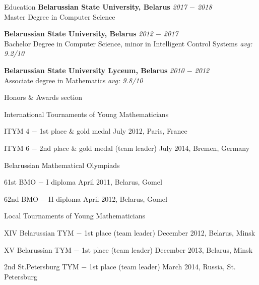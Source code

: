 \documentclass{resume} %
\begin{document}

\begin{rSection}{Education}
{\bf Belarussian State University, Belarus} \hfill {\em 2017 $-$ 2018} \\
Master Degree in Computer Science

{\bf Belarussian State University, Belarus} \hfill {\em 2012 $-$ 2017} \\
Bachelor Degree in Computer Science, minor in Intelligent Control Systems \hfill {\em avg: 9.2/10}

{\bf Belarussian State University Lyceum, Belarus} \hfill {\em 2010 $-$ 2012} \\
Associate degree in Mathematics \hfill {\em avg: 9.8/10}
\end{rSection}


\begin{rSection}{Honors \& Awards section}

\begin{rSubsection}{International Tournaments of Young Mathematicians}{}{}

\item ITYM 4 $-$ 1st place \& gold medal \hfill July 2012, Paris, France
\item ITYM 6 $-$ 2nd place \& gold medal (team leader) \hfill July 2014, Bremen, Germany

\end{rSubsection}

\begin{rSubsection}{Belarussian Mathematical Olympiads}{}{}

\item 61st BMO $-$ I diploma \hfill  April 2011, Belarus, Gomel
\item 62nd BMO $-$ II diploma \hfill April 2012, Belarus, Gomel
\end{rSubsection}


\begin{rSubsection}{Local Tournaments of Young Mathematicians}{}{}

\item XIV Belarussian TYM $-$ 1st place (team leader) \hfill December 2012, Belarus, Minsk
\item XV Belarussian TYM $-$ 1st place (team leader) \hfill December 2013, Belarus, Minsk
\item 2nd St.Petersburg TYM $-$ 1st place (team leader) \hfill March 2014, Russia, St. Petersburg
\end{rSubsection}

\end{rSection}
\end{document}
